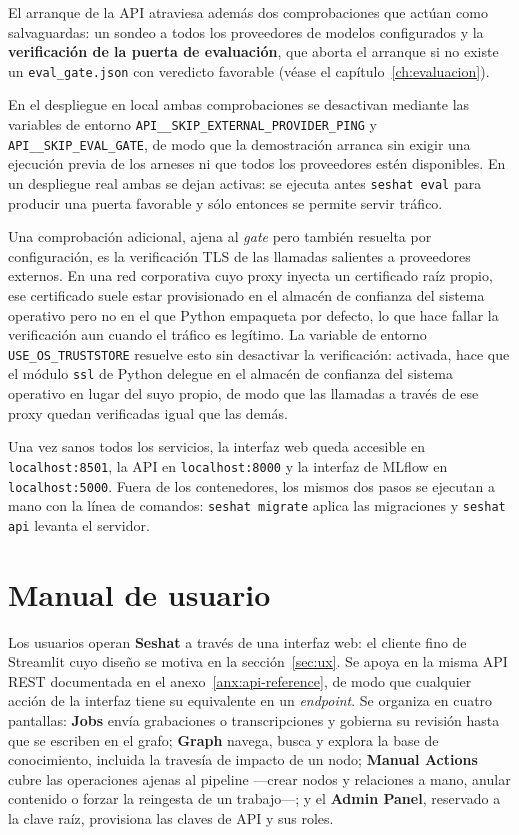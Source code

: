 El arranque de la \ac{API} atraviesa además dos comprobaciones que actúan como salvaguardas: un
sondeo a todos los proveedores de modelos configurados y la \textbf{verificación de la puerta de
evaluación}, que aborta el arranque si no existe un \texttt{eval\_gate.json} con veredicto favorable
(véase el capítulo~\ref{ch:evaluacion}).

En el despliegue en local ambas comprobaciones se desactivan mediante las variables de entorno
\texttt{API\_\_SKIP\_EXTERNAL\_PROVIDER\_PING} y \texttt{API\_\_SKIP\_EVAL\_GATE}, de modo
que la demostración arranca sin exigir una ejecución previa de los arneses ni que todos los
proveedores estén disponibles. En un despliegue real ambas se dejan activas: se ejecuta antes
\texttt{seshat eval} para producir una puerta favorable y sólo entonces se permite servir tráfico.

Una comprobación adicional, ajena al \textit{gate} pero también resuelta por configuración, es la
verificación TLS de las llamadas salientes a proveedores externos. En una red corporativa cuyo proxy
inyecta un certificado raíz propio, ese certificado suele estar provisionado en el almacén de
confianza del sistema operativo pero no en el que Python empaqueta por defecto, lo que hace fallar
la verificación aun cuando el tráfico es legítimo. La variable de entorno \texttt{USE\_OS\_TRUSTSTORE}
resuelve esto sin desactivar la verificación: activada, hace que el módulo \texttt{ssl} de Python
delegue en el almacén de confianza del sistema operativo en lugar del suyo propio, de modo que las
llamadas a través de ese proxy quedan verificadas igual que las demás.

Una vez sanos todos los servicios, la interfaz web queda accesible en \texttt{localhost:8501}, la
\ac{API} en \texttt{localhost:8000} y la interfaz de MLflow en \texttt{localhost:5000}. Fuera de los
contenedores, los mismos dos pasos se ejecutan a mano con la línea de comandos: \texttt{seshat
migrate} aplica las migraciones y \texttt{seshat api} levanta el servidor.

\section{Manual de usuario}
\label{anx:despliegue-manual}

Los usuarios operan \textbf{Seshat} a través de una interfaz web: el cliente fino de Streamlit cuyo
diseño se motiva en la sección~\ref{sec:ux}. Se apoya en la misma \ac{API} REST documentada en el
anexo~\ref{anx:api-reference}, de modo que cualquier acción de la interfaz tiene su equivalente en un
\textit{endpoint}. Se organiza en cuatro pantallas: \textbf{Jobs}
envía grabaciones o transcripciones y gobierna su revisión hasta que se escriben en el grafo;
\textbf{Graph} navega, busca y explora la base de conocimiento, incluida la travesía de impacto de un
nodo; \textbf{Manual Actions} cubre las operaciones ajenas al pipeline —crear nodos y relaciones a
mano, anular contenido o forzar la reingesta de un trabajo—; y el \textbf{Admin Panel}, reservado a
la clave raíz, provisiona las claves de \ac{API} y sus roles.


